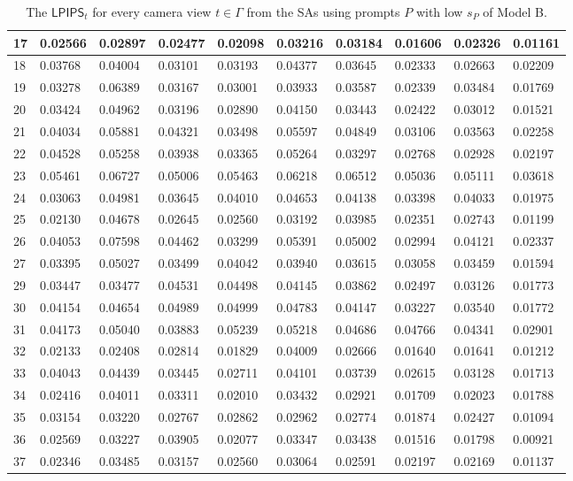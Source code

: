 \begin{table}[H]
{\begin{tabular}{|l|l|l|l|l|l|l|l|l|l|}
        17 & 0.02566 & 0.02897 & 0.02477 & 0.02098 & 0.03216 & 0.03184 & 0.01606 & 0.02326 & 0.01161 \\ \hline
        18 & 0.03768 & 0.04004 & 0.03101 & 0.03193 & 0.04377 & 0.03645 & 0.02333 & 0.02663 & 0.02209 \\ \hline
        19 & 0.03278 & 0.06389 & 0.03167 & 0.03001 & 0.03933 & 0.03587 & 0.02339 & 0.03484 & 0.01769 \\ \hline
        20 & 0.03424 & 0.04962 & 0.03196 & 0.02890 & 0.04150 & 0.03443 & 0.02422 & 0.03012 & 0.01521 \\ \hline
        21 & 0.04034 & 0.05881 & 0.04321 & 0.03498 & 0.05597 & 0.04849 & 0.03106 & 0.03563 & 0.02258 \\ \hline
        22 & 0.04528 & 0.05258 & 0.03938 & 0.03365 & 0.05264 & 0.03297 & 0.02768 & 0.02928 & 0.02197 \\ \hline
        23 & 0.05461 & 0.06727 & 0.05006 & 0.05463 & 0.06218 & 0.06512 & 0.05036 & 0.05111 & 0.03618 \\ \hline
        24 & 0.03063 & 0.04981 & 0.03645 & 0.04010 & 0.04653 & 0.04138 & 0.03398 & 0.04033 & 0.01975 \\ \hline
        25 & 0.02130 & 0.04678 & 0.02645 & 0.02560 & 0.03192 & 0.03985 & 0.02351 & 0.02743 & 0.01199 \\ \hline
        26 & 0.04053 & 0.07598 & 0.04462 & 0.03299 & 0.05391 & 0.05002 & 0.02994 & 0.04121 & 0.02337 \\ \hline
        27 & 0.03395 & 0.05027 & 0.03499 & 0.04042 & 0.03940 & 0.03615 & 0.03058 & 0.03459 & 0.01594 \\ \hline
        29 & 0.03447 & 0.03477 & 0.04531 & 0.04498 & 0.04145 & 0.03862 & 0.02497 & 0.03126 & 0.01773 \\ \hline
        30 & 0.04154 & 0.04654 & 0.04989 & 0.04999 & 0.04783 & 0.04147 & 0.03227 & 0.03540 & 0.01772 \\ \hline
        31 & 0.04173 & 0.05040 & 0.03883 & 0.05239 & 0.05218 & 0.04686 & 0.04766 & 0.04341 & 0.02901 \\ \hline
        32 & 0.02133 & 0.02408 & 0.02814 & 0.01829 & 0.04009 & 0.02666 & 0.01640 & 0.01641 & 0.01212 \\ \hline
        33 & 0.04043 & 0.04439 & 0.03445 & 0.02711 & 0.04101 & 0.03739 & 0.02615 & 0.03128 & 0.01713 \\ \hline
        34 & 0.02416 & 0.04011 & 0.03311 & 0.02010 & 0.03432 & 0.02921 & 0.01709 & 0.02023 & 0.01788 \\ \hline
        35 & 0.03154 & 0.03220 & 0.02767 & 0.02862 & 0.02962 & 0.02774 & 0.01874 & 0.02427 & 0.01094 \\ \hline
        36 & 0.02569 & 0.03227 & 0.03905 & 0.02077 & 0.03347 & 0.03438 & 0.01516 & 0.01798 & 0.00921 \\ \hline
        37 & 0.02346 & 0.03485 & 0.03157 & 0.02560 & 0.03064 & 0.02591 & 0.02197 & 0.02169 & 0.01137 \\ \hline
    \end{tabular}}
	\caption{The $ \mathsf{LPIPS}_t$ for every camera view $t \in \varGamma$ from the SAs using prompts $P$ with low $s_P$ of Model B.}
\end{table}

